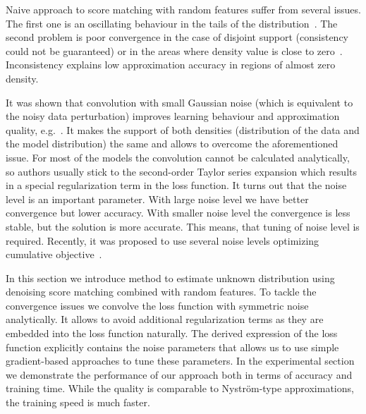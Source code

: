Naive approach to score matching with random features suffer from several issues.
The first one is an oscillating behaviour in the tails of the distribution~\cite{Gretton2015}.
The second problem is poor convergence in the case of disjoint support
(consistency could not be guaranteed) or in the areas
where density value is close to zero~\cite{GrettonDeep}.
Inconsistency explains low approximation accuracy in regions of almost zero density.

It was shown that convolution with small Gaussian noise
(which is equivalent to the noisy data perturbation) improves learning behaviour and approximation
quality, e.g.~\cite{song2019generative,GANinstability, NoisyFGAN}.
It makes the support of both densities (distribution of the data and the model distribution)
the same and allows to overcome the aforementioned issue.
For most of the models the convolution cannot be calculated analytically,
so authors usually stick to the second-order Taylor series expansion
\cite{NIPS2010_4060, Reehorst_2019, NoisyFGAN} which results in a special
regularization term in the loss function.
It turns out that the noise level is an important parameter.
With large noise level we have better convergence but lower accuracy.
With smaller noise level the convergence is less stable, but the
solution is more accurate.
This means, that tuning of noise level is required.
Recently, it was proposed to use several noise levels optimizing
cumulative objective~\cite{song2019generative}.


In this section we introduce method to estimate unknown distribution using
denoising score matching combined with random features.
To tackle the convergence issues we convolve the loss function with symmetric noise analytically.
It allows to avoid additional regularization terms as they are embedded into the loss function naturally.
The derived expression of the loss function explicitly contains the noise parameters
that allows us to use simple gradient-based approaches to tune these parameters.
In the experimental section we demonstrate the performance of our approach both in terms of
accuracy and training time.
While the quality is comparable to Nystr{\"o}m-type approximations, the training speed is much faster.




